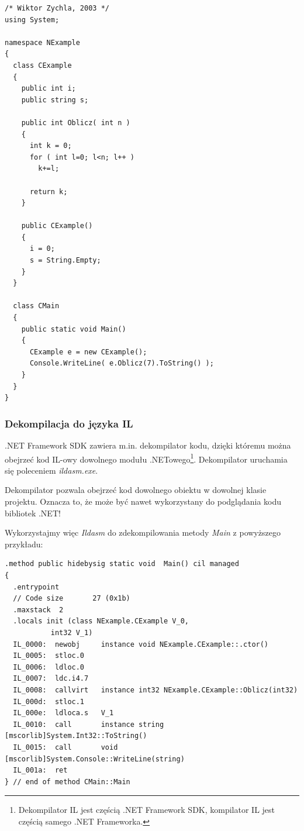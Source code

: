 \begin{scriptsize}
\begin{verbatim}
/* Wiktor Zychla, 2003 */
using System;

namespace NExample
{
  class CExample
  {
    public int i;
    public string s;

    public int Oblicz( int n )
    {
      int k = 0;
      for ( int l=0; l<n; l++ )
        k+=l;

      return k;
    }

    public CExample()
    {
      i = 0;
      s = String.Empty;
    }
  }

  class CMain
  {
    public static void Main()
    {
      CExample e = new CExample();
      Console.WriteLine( e.Oblicz(7).ToString() );
    }
  }
}
\end{verbatim}
\end{scriptsize}

\subsubsection{Dekompilacja do języka IL}

.NET Framework SDK zawiera m.in. dekompilator kodu, dzięki któremu można obejrzeć
kod IL-owy dowolnego modułu .NETowego\footnote{Dekompilator IL jest częścią .NET Framework SDK, 
kompilator IL jest częścią samego .NET Frameworka.}.
Dekompilator uruchamia się poleceniem {\em ildasm.exe}.

Dekompilator pozwala obejrzeć kod dowolnego obiektu w dowolnej klasie projektu. Oznacza to, że może być
nawet wykorzystany do podglądania kodu bibliotek .NET! 

Wykorzystajmy więc {\em Ildasm} do zdekompilowania metody {\em Main} z powyższego
przykładu:

\begin{scriptsize}
\begin{verbatim}
.method public hidebysig static void  Main() cil managed
{
  .entrypoint
  // Code size       27 (0x1b)
  .maxstack  2
  .locals init (class NExample.CExample V_0,
           int32 V_1)
  IL_0000:  newobj     instance void NExample.CExample::.ctor()
  IL_0005:  stloc.0    
  IL_0006:  ldloc.0
  IL_0007:  ldc.i4.7
  IL_0008:  callvirt   instance int32 NExample.CExample::Oblicz(int32)
  IL_000d:  stloc.1
  IL_000e:  ldloca.s   V_1
  IL_0010:  call       instance string [mscorlib]System.Int32::ToString()
  IL_0015:  call       void [mscorlib]System.Console::WriteLine(string)
  IL_001a:  ret
} // end of method CMain::Main
\end{verbatim}
\end{scriptsize}


